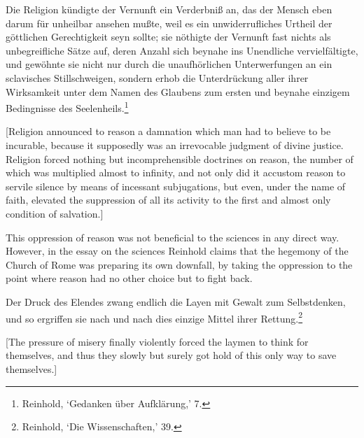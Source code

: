 Die Religion k\"{u}ndigte der Vernunft ein Verderbni\ss{} an, das der Mensch eben darum f\"{u}r unheilbar ansehen mu\ss{}te, weil es ein unwiderrufliches Urtheil der g\"{o}ttlichen Gerechtigkeit seyn sollte; sie n\"{o}thigte der Vernunft fast nichts als unbegreifliche S\"{a}tze auf, deren Anzahl sich beynahe ins Unendliche vervielf\"{a}ltigte, und gew\"{o}hnte sie nicht nur durch die unaufh\"{o}rlichen Unterwerfungen an ein sclavisches Stillschweigen, sondern erhob die Unterdr\"{u}ckung aller ihrer Wirksamkeit unter dem Namen des Glaubens zum ersten und beynahe einzigem Bedingnisse des Seelenheils.\footnote{ Reinhold, `Gedanken \"{u}ber Aufkl\"{a}rung,' 7.}

[Religion announced to reason a damnation which man had to believe to be incurable, because it supposedly was an irrevocable judgment of divine justice. Religion forced nothing but incomprehensible doctrines on reason, the number of which was multiplied almost to infinity, and not only did it accustom reason to servile silence by means of incessant subjugations, but even, under the name of faith, elevated the suppression of all its activity to the first and almost only condition of salvation.]

This oppression of reason was not beneficial to the sciences in any direct way. However, in the essay on the sciences Reinhold claims that the hegemony of the Church of Rome was preparing its own downfall, by taking the oppression to the point where reason had no other choice but to fight back. 

Der Druck des Elendes zwang endlich die Layen mit Gewalt zum Selbstdenken, und so ergriffen sie nach und nach dies einzige Mittel ihrer Rettung.\footnote{ Reinhold, `Die Wissenschaften,' 39. } 

[The pressure of misery finally violently forced the laymen to think for themselves, and thus they slowly but surely got hold of this only way to save themselves.]

